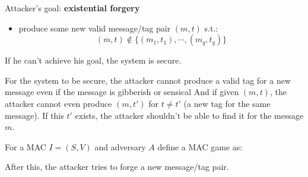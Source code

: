 \documentclass[12pt]{book}
\begin{document}
Attacker's goal: \textbf{existential forgery}
\begin{itemize}
	\item produce some new valid message/tag pair $(m,t)$ s.t.: $$(m,t)\notin \{(m_{1},t_{1}),\cdots,(m_{q},t_{q})\}$$
\end{itemize}
If he can't achieve his goal, the system is secure.

For the system to be secure, the attacker cannot produce a valid tag for a new message even if the message is gibberish or sensical And if given $(m,t)$, the attacker cannot even produce $(m,t')$ for $t\neq t'$ (a new tag for the same message). If this $t'$ exists, the attacker shouldn't be able to find it for the message $m$.

For a MAC $I=(S,V)$ and adversary $A$ define a MAC game as:
\begin{center}
\end{center}After this, the attacker tries to forge a new message/tag pair.
\end{document}
